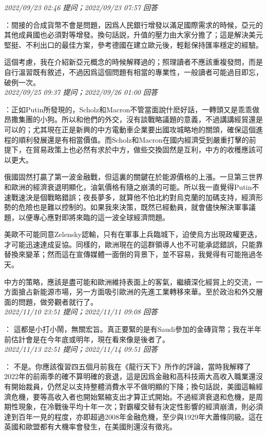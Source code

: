 \documentclass[twocolumn]{ctexart}
\begin{document}
\textit{\hfill\noindent\small 2022/09/23 02:46 提问；2022/09/23 07:57 回答}

：間接的合成貨幣不會是問題，因爲人民銀行增發以滿足國際需求的時候，亞元的其他成員國也必須對等增發。換句話説，升值的壓力由大家分擔了；這是解決美元堅挺、不利出口的最佳方案，參考德國在建立歐元後，輕鬆保持匯率穩定的經驗。

這個考慮，我在介紹新亞元概念的時候解釋過的；照理讀者不應該重複發問，而是自行溫習既有敘述，不過因爲這個問題有相當的專業性，一般讀者可能過目即忘，破例一次。
\\

\textit{\hfill\noindent\small 2022/09/25 09:37 提问；2022/09/26 01:00 回答}

：正如Putin所發現的，Scholz和Macron不管當面說什麽好話，一轉頭又是乖乖做昂撒集團的小狗。所以和他們的外交，沒有談戰略議題的意義，不過講講經貿還是可以的；尤其現在正是新興的中方電動車企業要出國攻城略地的關頭，確保這個進程的順利發展還是有相當價值。而Scholz和Macron在國内經濟受到嚴重打擊的前提下，在貿易政策上也必然有求於中方，做些交換固然是互利，中方的收穫應該可以更大。

俄國固然打贏了第一波金融戰，但這裏的關鍵在於能源價格的上漲。一旦第三世界和歐洲的經濟衰退明顯化，油氣價格有隨之崩潰的可能。所以我一直覺得Putin不速戰速決是個戰略錯誤；夜長夢多，就算他不怕北約對烏克蘭的加碼支持，經濟形勢的危險也是難以控制的。如果我來決策，既然已經動員，就會儘快解決軍事議題，以便專心應對即將來臨的這一波全球經濟問題。

美歐不可能同意Zelensky認輸，只有在軍事上兵臨城下，迫使烏方出現政權更迭，才可能迅速達成妥協。同樣的，歐洲現在的這群領導人也不可能承認錯誤，只能靠替換來變革；然而這在宣傳媒體一面倒的背景下，並不容易，我覺得有可能拖過冬天。

中方的策略，應該是盡可能和歐洲維持表面上的客氣，繼續深化經貿上的交流，一方面搶占新能源市場，另一方面吸引歐洲的先進工業轉移來華。至於政治和外交層面的問題，做旁觀者就行了。
\\

\textit{\hfill\noindent\small 2022/11/10 23:51 提问；2022/11/11 09:08 回答}

：
這都是小打小鬧，無關宏旨。真正要緊的是有Saudi參加的金磚貨幣；我在半年前估計會是在今年底或明年，現在看來像是後者了。
\\

\textit{\hfill\noindent\small 2022/11/13 22:51 提问；2022/11/14 09:51 回答}

：
不是。你應該復習四五個月前我在《龍行天下》所作的評論，當時我解釋了2022年的前兩季的確不算明確的衰退，這是因爲金融和高科技兩大高收入職業還沒有開始裁員，仍然足以支持整體消費水平不做明顯的下降；換句話説，美國這輪經濟危機，要等高收入者也開始緊縮支出才算正式開始。不過經濟衰退和危機，是周期性現象，在冷戰後平均十年一次；對霸權交替有決定性影響的經濟崩潰，則必須達到百年一見的程度，亦即超過2008年金融危機，至少與1929年大蕭條同級。這在英國和歐盟都有大機率會發生，在美國則還沒有徵兆。
\\
\end{document}
